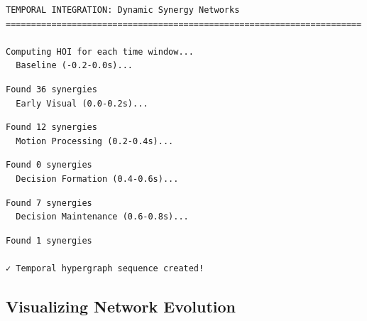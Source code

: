 \documentclass[
  11pt,
  letterpaper,
  oneside,
  openany]{book}
\begin{document}
\begin{verbatim}
TEMPORAL INTEGRATION: Dynamic Synergy Networks
======================================================================

Computing HOI for each time window...
  Baseline (-0.2-0.0s)... 
\end{verbatim}

\begin{verbatim}
Found 36 synergies
  Early Visual (0.0-0.2s)... 
\end{verbatim}

\begin{verbatim}
Found 12 synergies
  Motion Processing (0.2-0.4s)... 
\end{verbatim}

\begin{verbatim}
Found 0 synergies
  Decision Formation (0.4-0.6s)... 
\end{verbatim}

\begin{verbatim}
Found 7 synergies
  Decision Maintenance (0.6-0.8s)... 
\end{verbatim}

\begin{verbatim}
Found 1 synergies

✓ Temporal hypergraph sequence created!
\end{verbatim}

\subsection{Visualizing Network
Evolution}\label{visualizing-network-evolution}
\end{document}
